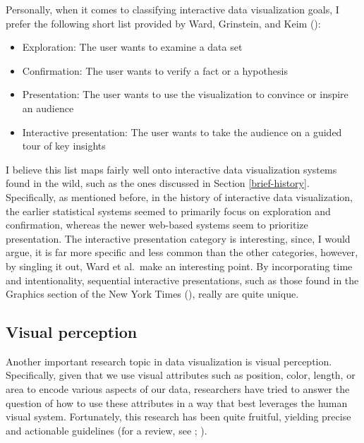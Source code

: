 \documentclass[
]{book}
\providecommand{\tightlist}{%
  \setlength{\itemsep}{0pt}\setlength{\parskip}{0pt}}
\theoremstyle{definition}
\theoremstyle{definition}
\theoremstyle{definition}
\theoremstyle{definition}
\theoremstyle{remark}
\begin{document}
Personally, when it comes to classifying interactive data visualization goals, I prefer the following short list provided by Ward, Grinstein, and Keim ():

\begin{itemize}
\tightlist
\item
  Exploration: The user wants to examine a data set
\item
  Confirmation: The user wants to verify a fact or a hypothesis
\item
  Presentation: The user wants to use the visualization to convince or inspire an audience
\item
  Interactive presentation: The user wants to take the audience on a guided tour of key insights
\end{itemize}

I believe this list maps fairly well onto interactive data visualization systems found in the wild, such as the ones discussed in Section \ref{brief-history}. Specifically, as mentioned before, in the history of interactive data visualization, the earlier statistical systems seemed to primarily focus on exploration and confirmation, whereas the newer web-based systems seem to prioritize presentation. The interactive presentation category is interesting, since, I would argue, it is far more specific and less common than the other categories, however, by singling it out, Ward et al.~make an interesting point. By incorporating time and intentionality, sequential interactive presentations, such as those found in the Graphics section of the New York Times (), really are quite unique.

\subsection{Visual perception}\label{visual-perception}

Another important research topic in data visualization is visual perception. Specifically, given that we use visual attributes such as position, color, length, or area to encode various aspects of our data, researchers have tried to answer the question of how to use these attributes in a way that best leverages the human visual system. Fortunately, this research has been quite fruitful, yielding precise and actionable guidelines (for a review, see ; ).
\end{document}
